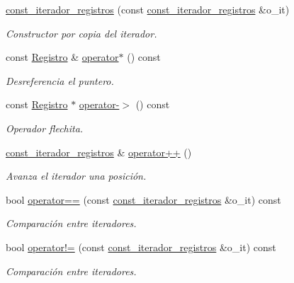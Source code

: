 \begin{DoxyCompactItemize}
\item 
\hyperlink{classTabla_1_1const__iterador__registros_a904a84af50ced6c3d9e77e10d6e5192a}{const\+\_\+iterador\+\_\+registros} (const \hyperlink{classTabla_1_1const__iterador__registros}{const\+\_\+iterador\+\_\+registros} \&o\+\_\+it)
\begin{DoxyCompactList}\small\item\em Constructor por copia del iterador. \end{DoxyCompactList}\item 
const \hyperlink{classRegistro}{Registro} \& \hyperlink{classTabla_1_1const__iterador__registros_ae09f1cd7f790f7b3d9cb392a6f8ebbe5}{operator$\ast$} () const 
\begin{DoxyCompactList}\small\item\em Desreferencia el puntero. \end{DoxyCompactList}\item 
const \hyperlink{classRegistro}{Registro} $\ast$ \hyperlink{classTabla_1_1const__iterador__registros_aca0f97220fabe6bf6f822f1b217c76d5}{operator-\/$>$} () const 
\begin{DoxyCompactList}\small\item\em Operador flechita. \end{DoxyCompactList}\item 
\hyperlink{classTabla_1_1const__iterador__registros}{const\+\_\+iterador\+\_\+registros} \& \hyperlink{classTabla_1_1const__iterador__registros_a396373a330a7c56e3112df2bcccef885}{operator++} ()
\begin{DoxyCompactList}\small\item\em Avanza el iterador una posición. \end{DoxyCompactList}\item 
bool \hyperlink{classTabla_1_1const__iterador__registros_a97bb754644a0761f832bb858df07b2ff}{operator==} (const \hyperlink{classTabla_1_1const__iterador__registros}{const\+\_\+iterador\+\_\+registros} \&o\+\_\+it) const 
\begin{DoxyCompactList}\small\item\em Comparación entre iteradores. \end{DoxyCompactList}\item 
bool \hyperlink{classTabla_1_1const__iterador__registros_a042b2cc92666f899b9b503327f84b7ac}{operator!=} (const \hyperlink{classTabla_1_1const__iterador__registros}{const\+\_\+iterador\+\_\+registros} \&o\+\_\+it) const 
\begin{DoxyCompactList}\small\item\em Comparación entre iteradores. \end{DoxyCompactList}\end{DoxyCompactItemize}

